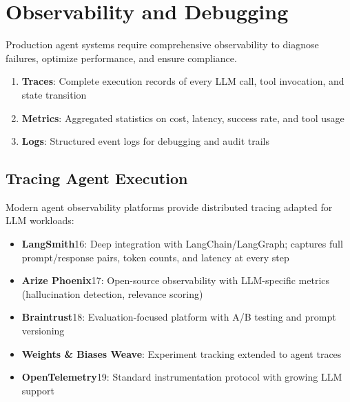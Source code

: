 \section{Observability and Debugging}
\label{subsec:observability}

Production agent systems require comprehensive observability to diagnose failures, optimize performance, and ensure compliance.

\begin{keybox}
\begin{enumerate}
  \item \textbf{Traces}: Complete execution records of every LLM call, tool invocation, and state transition
  \item \textbf{Metrics}: Aggregated statistics on cost, latency, success rate, and tool usage
  \item \textbf{Logs}: Structured event logs for debugging and audit trails
\end{enumerate}
\end{keybox}

\subsection{Tracing Agent Execution}
\label{tracing-agent-execution}

Modern agent observability platforms provide distributed tracing adapted for LLM workloads:

\begin{itemize}
  \item \textbf{LangSmith}16: Deep integration with LangChain/LangGraph; captures full prompt/response pairs, token counts, and latency at every step
  \item \textbf{Arize Phoenix}17: Open-source observability with LLM-specific metrics (hallucination detection, relevance scoring)
  \item \textbf{Braintrust}18: Evaluation-focused platform with A/B testing and prompt versioning
  \item \textbf{Weights \& Biases Weave}: Experiment tracking extended to agent traces
  \item \textbf{OpenTelemetry}19: Standard instrumentation protocol with growing LLM support
\end{itemize}

